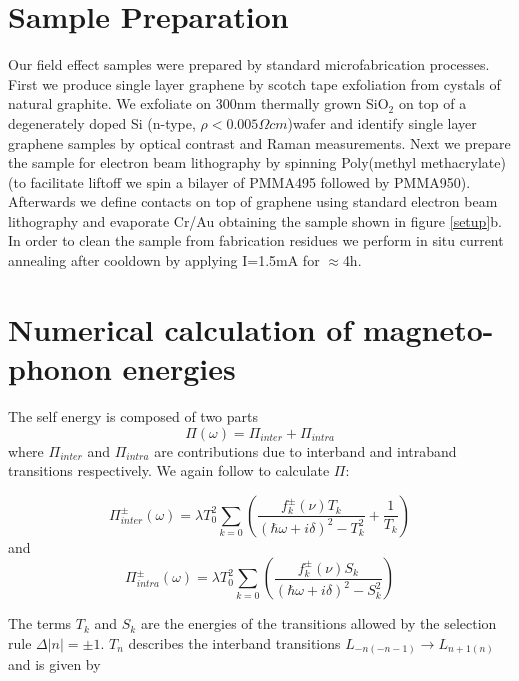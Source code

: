 \documentclass[prl,aps,superscriptaddress,preprint]{revtex4-1}
\begin{document}
\section{Sample Preparation}
Our field effect samples were prepared by standard microfabrication processes. First we produce single layer graphene by scotch tape exfoliation from cystals of natural graphite. We exfoliate on 300nm thermally grown SiO$_2$ on top of a degenerately doped Si (n-type, $\rho < 0.005 \Omega cm$)wafer \cite{novoselov2005two,novoselov2004electric} and identify single layer graphene samples by optical contrast and Raman measurements. Next we prepare the sample for electron beam lithography by spinning Poly(methyl methacrylate) (to facilitate liftoff we spin a bilayer of PMMA495 followed by PMMA950). Afterwards we define contacts on top of graphene using standard electron beam lithography and evaporate Cr/Au obtaining the sample shown in figure \ref{setup}b. In order to clean the sample from fabrication residues we perform in situ current annealing after cooldown by applying I=1.5mA for $\approx$4h.
\section{Numerical calculation of magneto-phonon energies}


 The self energy is composed of two parts
\begin{displaymath}
\Pi\left(\omega\right)=\Pi_{inter}+\Pi_{intra} \nonumber
\end{displaymath}
where $\Pi_{inter}$ and $\Pi_{intra}$ are contributions due to interband and intraband transitions respectively. We again follow \cite{ando2007magnetic} to calculate $\Pi$:

\begin{equation}
\Pi^{\pm}_{inter}\left(\omega\right)=\lambda T_0^2\sum_{k=0}{\left(\frac{f^{\pm}_k\left(\nu\right)T_k}{\left(\hbar\omega+i\delta\right)^2-T_k^2}+\frac{1}{T_k}\right)}
\end{equation}
and
\begin{equation}
\Pi^{\pm}_{intra}\left(\omega\right)=\lambda T_0^2\sum_{k=0}{\left(\frac{f^{\pm}_k\left(\nu\right)S_k}{\left(\hbar\omega+i\delta\right)^2-S_k^2}\right)}
\end{equation}

The terms $T_k$ and $S_k$ are the energies of the transitions allowed by the selection rule $\Delta \left| n \right| = \pm 1$. $T_n$ describes the interband transitions $L_{-n(-n-1)}\rightarrow L_{n+1(n)}$ and is given by
\end{document}
